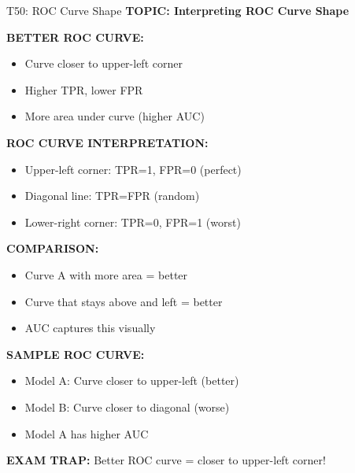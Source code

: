 \documentclass[8pt]{beamer}
\begin{document}
	\begin{frame}{T50: ROC Curve Shape}
		\fontsize{6.5}{7.5}\selectfont
		\textbf{TOPIC: Interpreting ROC Curve Shape}
		
		\vspace{0.1cm}
		\textbf{BETTER ROC CURVE:}
		\begin{itemize}
			\item Curve closer to upper-left corner
			\item Higher TPR, lower FPR
			\item More area under curve (higher AUC)
		\end{itemize}
		
		\vspace{0.1cm}
		\textbf{ROC CURVE INTERPRETATION:}
		\begin{itemize}
			\item \textcolor{mygreen}{Upper-left corner:} TPR=1, FPR=0 (perfect)
			\item \textcolor{myblue}{Diagonal line:} TPR=FPR (random)
			\item \textcolor{myred}{Lower-right corner:} TPR=0, FPR=1 (worst)
		\end{itemize}
		
		\vspace{0.1cm}
		\textbf{COMPARISON:}
		\begin{itemize}
			\item Curve A with more area = better
			\item Curve that stays above and left = better
			\item AUC captures this visually
		\end{itemize}
		
		\vspace{0.1cm}
		\textbf{SAMPLE ROC CURVE:}
		\begin{itemize}
			\item Model A: Curve closer to upper-left (better)
			\item Model B: Curve closer to diagonal (worse)
			\item Model A has higher AUC
		\end{itemize}
		
		\textcolor{myred}{\textbf{EXAM TRAP:}} Better ROC curve = \textcolor{myblue}{closer to upper-left corner}!
	\end{frame}
	
\end{document}
